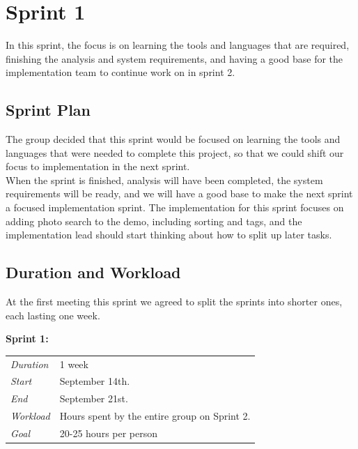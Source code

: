 \chapter{Sprint 1}
\label{chap:Sprint1}
In this sprint, the focus is on learning the tools and languages that are required, finishing the analysis and system requirements, and having a good base for the implementation team to continue work on in sprint 2.

\section{Sprint Plan}
\label{sec:S1Planning}
The group decided that this sprint would be focused on learning the tools and languages that were needed to complete this project, so that we could shift our focus to implementation in the next sprint. \\
\indent When the sprint is finished, analysis will have been completed, the system requirements will be ready, and we will have a good base to make the next sprint a focused implementation sprint. The implementation for this sprint focuses on adding photo search to the demo, including sorting and tags, and the implementation lead should start thinking about how to split up later tasks.

\section{Duration and Workload}
\label{sec:S1DurationWorkload}
At the first meeting this sprint we agreed to split the sprints into shorter ones, each lasting one week. \\

\begin{minipage}{\linewidth}
\centering
\setlength{\tabcolsep}{22pt}
\textbf{Sprint 1:} 
\smallskip
{}
\begin{tabular}{ |l l| }
	\hline
	\it{Duration} & 1 week \\
	\it{Start} & September 14th. \\
	\it{End} & September 21st. \\
	\it{Workload} & Hours spent by the entire group on Sprint 2. \\
	\it{Goal} & 20-25 hours per person \\
	\hline
\end{tabular}
\end{minipage}

